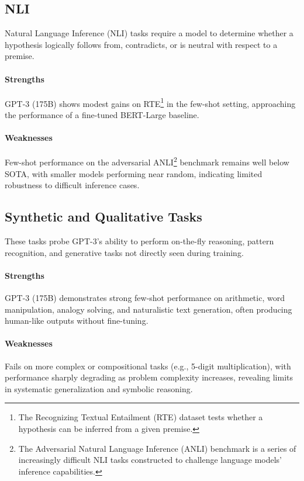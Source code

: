 \documentclass[10pt]{article}
\begin{document}
\subsection*{NLI}
Natural Language Inference (NLI) tasks require a model to determine whether a hypothesis logically follows from, contradicts, or is neutral with respect to a premise.

\paragraph{Strengths}
GPT-3 (175B) shows modest gains on RTE\footnote{The Recognizing Textual Entailment (RTE) dataset tests whether a hypothesis can be inferred from a given premise.} in the few-shot setting, approaching the performance of a fine-tuned BERT-Large baseline.

\paragraph{Weaknesses}
Few-shot performance on the adversarial ANLI\footnote{The Adversarial Natural Language Inference (ANLI) benchmark is a series of increasingly difficult NLI tasks constructed to challenge language models' inference capabilities.} benchmark remains well below SOTA, with smaller models performing near random, indicating limited robustness to difficult inference cases.


\subsection*{Synthetic and Qualitative Tasks}
These tasks probe GPT-3's ability to perform on-the-fly reasoning, pattern recognition, and generative tasks not directly seen during training.

\paragraph{Strengths}
GPT-3 (175B) demonstrates strong few-shot performance on arithmetic, word manipulation, analogy solving, and naturalistic text generation, often producing human-like outputs without fine-tuning.

\paragraph{Weaknesses}
Fails on more complex or compositional tasks (e.g., 5-digit multiplication), with performance sharply degrading as problem complexity increases, revealing limits in systematic generalization and symbolic reasoning.
\end{document}
